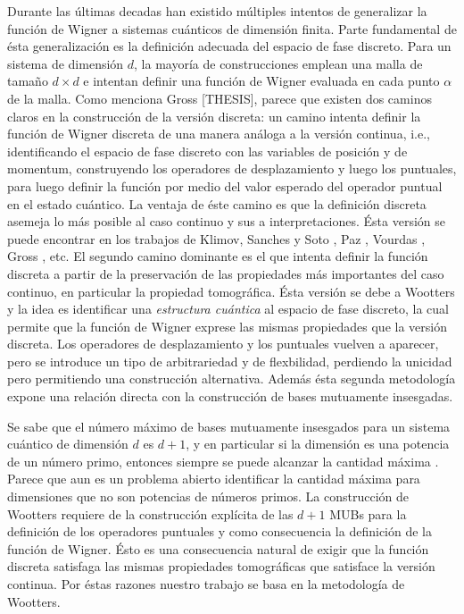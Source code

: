 \documentclass[a4paper]{report}
\begin{document}
  Durante las últimas decadas han existido múltiples
  intentos de generalizar la función de Wigner a sistemas
  cuánticos de dimensión finita. Parte fundamental de ésta
  generalización es la definición adecuada del espacio de
  fase discreto. Para un sistema de dimensión $d$, la
  mayoría de construcciones emplean una malla de tamaño $d
  \times d$ e intentan definir una función de Wigner
  evaluada en cada punto $\alpha$ de la malla. Como menciona
  Gross [THESIS], parece que existen dos caminos claros en
  la construcción de la versión discreta: un camino intenta
  definir la función de Wigner discreta de una manera
  análoga a la versión continua, i.e., identificando el
  espacio de fase discreto con las variables de posición y
  de momentum, construyendo los operadores de desplazamiento
  y luego los puntuales, para luego definir la función por
  medio del valor esperado del operador puntual en el estado
  cuántico. La ventaja de éste camino es que la definición
  discreta asemeja lo más posible al caso continuo y sus a
  interpretaciones.  Ésta versión se puede encontrar en los
  trabajos de Klimov, Sanches y Soto \cite{klimov2005}, Paz
  \cite{paz}, Vourdas \cite{vourdas2005}, Gross
  \cite{gross2005}, etc. El segundo camino dominante es el
  que intenta definir la función discreta a partir de la
  preservación de las propiedades más importantes del caso
  continuo, en particular la propiedad tomográfica. Ésta
  versión se debe a Wootters \cite{gibbons2004} y la idea es
  identificar una \textit{estructura cuántica} al espacio de
  fase discreto, la cual permite que la función de Wigner
  exprese las mismas propiedades que la versión discreta.
  Los operadores de desplazamiento y los puntuales vuelven a
  aparecer, pero se introduce un tipo de arbitrariedad y de
  flexbilidad, perdiendo la unicidad pero permitiendo una
  construcción alternativa. Además ésta segunda metodología
  expone una relación directa con la construcción de bases
  mutuamente insesgadas.

  Se sabe que el número máximo de bases mutuamente
  insesgados para un sistema cuántico de dimensión $d$ es
  $d+1$, y en particular si la dimensión es una potencia de
  un número primo, entonces siempre se puede alcanzar la
  cantidad máxima \cite{gibbons2004}. Parece que aun es un
  problema abierto identificar la cantidad máxima para
  dimensiones que no son potencias de números primos. La
  construcción de Wootters requiere de la construcción
  explícita de las $d+1$ MUBs para la definición de los
  operadores puntuales y como consecuencia la definición de
  la función de Wigner. Ésto es una consecuencia natural de
  exigir que la función discreta satisfaga las mismas
  propiedades tomográficas que satisface la versión
  continua. Por éstas razones nuestro trabajo se basa en la
  metodología de Wootters.
\end{document}

